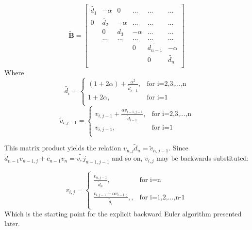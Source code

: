 \documentclass[%
oneside,                 %
final,                   %
10pt]{article}
\begin{document}
\[
    \mathbf{\tilde{B}} = \begin{bmatrix}
                      \tilde{d_1}& -\alpha & 0 &\dots   & \dots &\dots  \\
                           0 & \tilde{d_2} & -\alpha &\dots &\dots &\dots \\
                           & 0 & d_3 & -\alpha & \dots & \dots     \\
                           & \dots   & \dots &\dots   &\dots  &\dots  \\
                           &   &  &0  &\tilde{d_{n-1}}& -\alpha  \\
                           &    &  &   &0 & \tilde{d_n}  \\
                      \end{bmatrix}
                      \label{finalmatrixproduct}
\]
Where \begin{equation}
\tilde{d_i} =
  \begin{cases}
                                  (1+2 \alpha)+\frac{\alpha^2}{\tilde{d}_{i-1}},  & \text{for i=2,3,...,n}\\
                                   1+2 \alpha ,  & \text{for i=1} \\

  \end{cases}
\label{eq:tilded_i}
\end{equation}
\begin{equation}
\tilde{v}_{i,j-1}=
  \begin{cases}
                                  v_{i,j-1}+\frac{\alpha \tilde{v}_{i-1,j-1} }{\tilde{d}_{i-1}}, & \text{for i=2,3,...,n}\\
                                   v_{i,j-1} ,  & \text{for i=1} \\

  \end{cases}
\label{eq:b_i}
\end{equation}

This matrix product yields the relation $v_{n,j} \tilde{d}_n=\tilde{v}_{n,j-1}$. Since $\tilde{d}_{n-1} v_{n-1,j} + c_{n-1} v_n = \tilde{v,j}_{n-1,j-1}$ and so on, $v_{i,j}$ may be backwards substituted:\par 

\begin{equation}
   v_{i,j} =
  \begin{cases}
                                  \frac{\tilde{v}_{n,j-1}}{\tilde{d}_n} ,  & \text{for i=n}\\
                \frac{\tilde{v}_{i,j-1}+\alpha v_{i-1,j}}{\tilde{d}_i}, , & \text{for i=1,2,...,n-1}                    \\

  \end{cases}
\label{eq:v_i}
\end{equation}
Which is the starting point for the explicit backward Euler algorithm presented later. \newline
\end{document}
